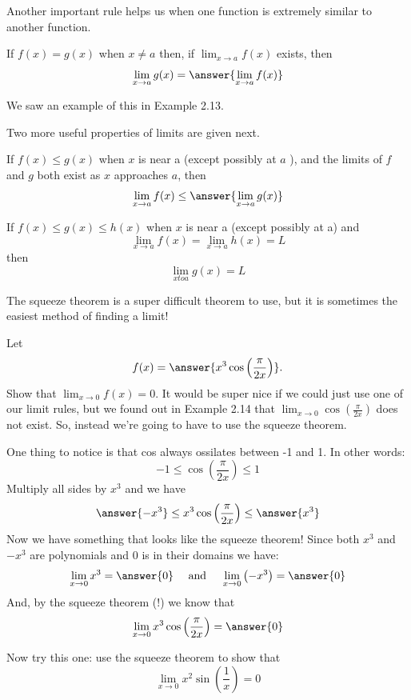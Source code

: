 \documentclass{ximera}
\begin{document}
Another important rule helps us when one function is extremely similar to another function.

\begin{theorem}
\label{theorem:3-7}
If $f(x)=g(x)$ when $x \neq a$ then, if $\lim _{x \rightarrow a} f(x)$ exists, then
\[
\lim _{x \rightarrow a} g(x)=\answer{\lim _{x \rightarrow a} f(x)}
\]
\end{theorem}

We saw an example of this in Example 2.13.

Two more useful properties of limits are given next.

\begin{theorem}
\label{theorem:3-8}
If $f(x) \leq g(x)$ when $x$ is near a (except possibly at $a$ ), and the limits of $f$ and $g$ both exist as $x$ approaches $a$, then
\[
\lim _{x \rightarrow a} f(x) \leq \answer{\lim _{x \rightarrow a} g(x)}
\]
\end{theorem}

\begin{theorem}
\label{theorem:3-9}
If $f(x) \leq g(x) \leq h(x)$ when $x$ is near a (except possibly at a) and
\[
\lim _{x \rightarrow a} f(x)=\lim _{x \rightarrow a} h(x)=L
\]
then
\[
\lim _{x t o a} g(x)=L
\]
\end{theorem}

The squeeze theorem is a super difficult theorem to use, but it is sometimes the easiest method of finding a limit!

\begin{example}
\label{example:3-10}
Let
\[
f(x)=\answer{x^{3} \cos \left(\frac{\pi}{2 x}\right)} .
\]
Show that $\lim _{x \rightarrow 0} f(x)=0$. It would be super nice if we could just use one of our limit rules, but we found out in Example 2.14 that $\lim _{x \rightarrow 0} \cos \left(\frac{\pi}{2 x}\right)$ does not exist. So, instead we're going to have to use the squeeze theorem.

One thing to notice is that cos always ossilates between -1 and 1. In other words:
\[
-1 \leq \cos \left(\frac{\pi}{2 x}\right) \leq 1
\]
Multiply all sides by $x^{3}$ and we have
\[
\answer{-x^{3}} \leq x^{3} \cos \left(\frac{\pi}{2 x}\right) \leq \answer{x^{3}}
\]
Now we have something that looks like the squeeze theorem! Since both $x^{3}$ and $-x^{3}$ are polynomials and 0 is in their domains we have:
\[
\lim _{x \rightarrow 0} x^{3}=\answer{0} \quad \text { and } \quad \lim _{x \rightarrow 0}\left(-x^{3}\right)=\answer{0}
\]
And, by the squeeze theorem (!) we know that
\[
\lim _{x \rightarrow 0} x^{3} \cos \left(\frac{\pi}{2 x}\right)=\answer{0}
\]
\end{example}

\begin{exercise}
\label{exercise:3-11}
Now try this one: use the squeeze theorem to show that
\[
\lim _{x \rightarrow 0} x^{2} \sin \left(\frac{1}{x}\right)=0
\]
\begin{freeResponse}
\end{freeResponse}
\end{exercise}
\end{document}
